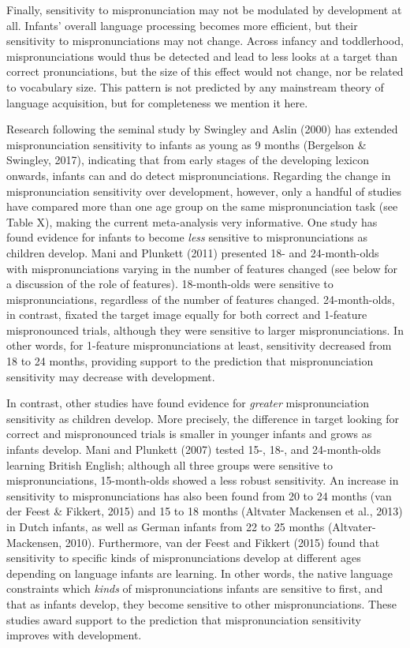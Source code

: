 \documentclass[man]{apa6}
\theoremstyle{definition}
\theoremstyle{definition}
\theoremstyle{definition}
\theoremstyle{remark}
\begin{document}
Finally, sensitivity to mispronunciation may not be modulated by
development at all. Infants' overall language processing becomes more
efficient, but their sensitivity to mispronunciations may not change.
Across infancy and toddlerhood, mispronunciations would thus be detected
and lead to less looks at a target than correct pronunciations, but the
size of this effect would not change, nor be related to vocabulary size.
This pattern is not predicted by any mainstream theory of language
acquisition, but for completeness we mention it here.

Research following the seminal study by Swingley and Aslin (2000) has
extended mispronunciation sensitivity to infants as young as 9 months
(Bergelson \& Swingley, 2017), indicating that from early stages of the
developing lexicon onwards, infants can and do detect mispronunciations.
Regarding the change in mispronunciation sensitivity over development,
however, only a handful of studies have compared more than one age group
on the same mispronunciation task (see Table X), making the current
meta-analysis very informative. One study has found evidence for infants
to become \emph{less} sensitive to mispronunciations as children
develop. Mani and Plunkett (2011) presented 18- and 24-month-olds with
mispronunciations varying in the number of features changed (see below
for a discussion of the role of features). 18-month-olds were sensitive
to mispronunciations, regardless of the number of features changed.
24-month-olds, in contrast, fixated the target image equally for both
correct and 1-feature mispronounced trials, although they were sensitive
to larger mispronunciations. In other words, for 1-feature
mispronunciations at least, sensitivity decreased from 18 to 24 months,
providing support to the prediction that mispronunciation sensitivity
may decrease with development.

In contrast, other studies have found evidence for \emph{greater}
mispronunciation sensitivity as children develop. More precisely, the
difference in target looking for correct and mispronounced trials is
smaller in younger infants and grows as infants develop. Mani and
Plunkett (2007) tested 15-, 18-, and 24-month-olds learning British
English; although all three groups were sensitive to mispronunciations,
15-month-olds showed a less robust sensitivity. An increase in
sensitivity to mispronunciations has also been found from 20 to 24
months (van der Feest \& Fikkert, 2015) and 15 to 18 months (Altvater
Mackensen et al., 2013) in Dutch infants, as well as German infants from
22 to 25 months (Altvater-Mackensen, 2010). Furthermore, van der Feest
and Fikkert (2015) found that sensitivity to specific kinds of
mispronunciations develop at different ages depending on language
infants are learning. In other words, the native language constraints
which \emph{kinds} of mispronunciations infants are sensitive to first,
and that as infants develop, they become sensitive to other
mispronunciations. These studies award support to the prediction that
mispronunciation sensitivity improves with development.
\end{document}
